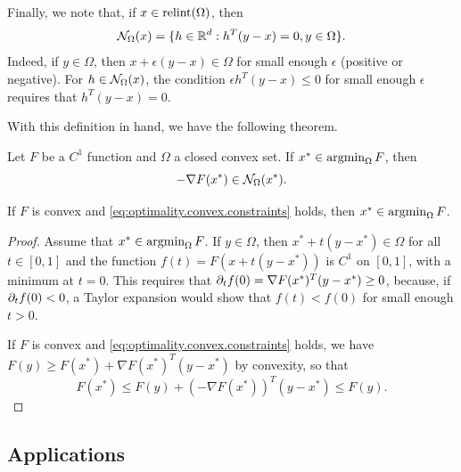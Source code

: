 Finally, we note that, if $x\in \mathrm{relint}(\Omega)$, then
\begin{equation}
\label{eq:normal.relint}
{\mathcal N}_\Omega(x) = \{h\in {\mathbb{R}}^d: h^T(y-x) = 0, y\in \Omega\}.
\end{equation}
Indeed, if $y\in \Omega$, then $x + \epsilon (y-x)\in \Omega$ for small enough $\epsilon$ (positive or negative).  For $ h \in {\mathcal N}_\Omega(x)$, the condition $\epsilon h^T(y-x) \leq 0$ for small enough $\epsilon$ requires that $h^T(y-x)=0$.

\bigskip

With this definition in hand, we have the following theorem.
\begin{theorem}
\label{th:optimality.convex.constraints}
Let $F$ be a $C^1$ function and $\Omega$ a closed convex set. If $x^* \in \operatorname*{argmin}_\Omega F$, then
\begin{equation}
- \nabla F(x^*) \in {\mathcal N}_\Omega(x^*).
\label{eq:optimality.convex.constraints}
\end{equation}

If $F$ is convex and \cref{eq:optimality.convex.constraints} holds, then $x^* \in \operatorname*{argmin}_\Omega F$.
\end{theorem}
\begin{proof}
Assume that $x^* \in \operatorname*{argmin}_\Omega F$. If $y\in \Omega$, then $x^* + t(y-x^*)\in \Omega$ for all $t\in [0,1]$ and the function $f(t) = F(x+ t(y-x^*))$ is $C^1$ on $[0,1]$, with a minimum at $t=0$. This requires that $\partial_t f(0) = \nabla F(x^*)^T(y-x^*) \geq 0$, because, if $\partial_t f(0) <0$, a Taylor expansion  would show that $f(t) < f(0)$ for small enough $t>0$.

If $F$ is convex and \cref{eq:optimality.convex.constraints} holds, we have $F(y) \geq F(x^*) +  \nabla F(x^*)^T(y-x^*)$ by convexity, so that
\[
F(x^*) \leq F(y) + (-\nabla F(x^*))^T(y-x^*) \leq F(y).
\]
\end{proof}


\subsection{Applications}

